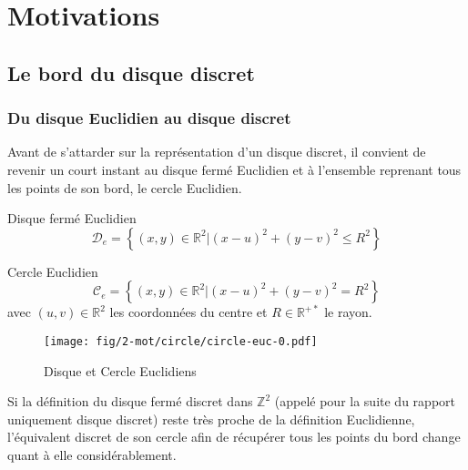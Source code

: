 \section{Motivations}

\subsection{Le bord du disque discret}

\subsubsection{Du disque Euclidien au disque discret}

Avant de s'attarder sur la représentation d'un disque discret, il convient de revenir un court instant au disque fermé Euclidien et à l'ensemble reprenant tous les points de son bord, le cercle Euclidien.

\begin{Definition}{Disque fermé Euclidien}
\label{def:disk-euc}
 $$\mathcal{D}_e =  \left\{ (x,y) \in \mathbb{R}^{2} |  (x - u)^2 + (y - v)^2 \leq R^2 \right\}$$
\end{Definition}

\begin{Definition}{Cercle Euclidien}
\label{def:cer-euc}
  $$\mathcal{C}_e =  \left\{ (x,y) \in \mathbb{R}^{2} |  (x - u)^2 + (y - v)^2 = R^2 \right\}$$
  avec $(u,v) \in \mathbb{R}^{2}$ les coordonnées du centre et $R \in \mathbb{R}^{+*}$ le rayon.\\
\end{Definition}



\begin{figure}[H]
  \centering
  \texttt{[image: fig/2-mot/circle/circle-euc-0.pdf]}
  \caption{Disque et Cercle Euclidiens}
\end{figure}

Si la définition du disque fermé discret dans $\mathbb{Z}^{2}$ (appelé pour la suite du rapport uniquement disque discret) reste très proche de la définition Euclidienne, l'équivalent discret de son cercle afin de récupérer tous les points du bord change quant à elle considérablement.

